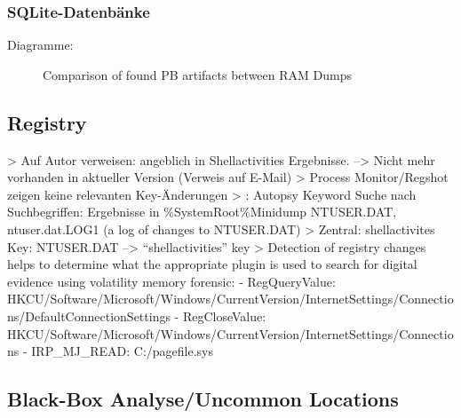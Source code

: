 \subsubsection*{SQLite-Datenbänke}
Diagramme:
\begin{figure}[h!]
	\label{chart:final-criteria}  
	\caption{Comparison of found PB artifacts between RAM Dumps}
\end{figure}


\subsection*{Registry}
>	Auf Autor verweisen: angeblich in Shellactivities Ergebnisse. --> Nicht mehr vorhanden in aktueller Version (Verweis auf E-Mail)
>	Process Monitor/Regshot zeigen keine relevanten Key-Änderungen
> \cite{Muir.2019}: Autopsy Keyword Suche nach Suchbegriffen: Ergebnisse in \%SystemRoot\%Minidump NTUSER.DAT, ntuser.dat.LOG1 (a log of changes to NTUSER.DAT)
> Zentral: shellactivites Key:	NTUSER.DAT --> “shellactivities” key \cite{Muir.2019}
> \cite{Rochmadi.2017} Detection of registry changes helps to determine what the appropriate plugin is used to search for digital evidence using volatility memory forensic:
- RegQueryValue:	HKCU/Software/Microsoft/Windows/CurrentVersion/InternetSettings/Connections/DefaultConnectionSettings
- RegCloseValue: 	HKCU/Software/Microsoft/Windows/CurrentVersion/InternetSettings/Connections
- IRP\_MJ\_READ: C:/pagefile.sys


\subsection*{Black-Box Analyse/Uncommon Locations}

